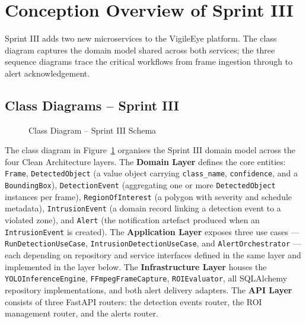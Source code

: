 \section{Conception Overview of Sprint III}
\label{sec:s3_conception}

\hspace{0.8cm}Sprint III adds two new microservices to the VigileEye platform. The class diagram captures the domain model shared across both services; the three sequence diagrams trace the critical workflows from frame ingestion through to alert acknowledgement.

\subsection{Class Diagrams -- Sprint III}
\label{subsec:s3_class}

\begin{figure}[H]
\centering
{}
\caption{Class Diagram -- Sprint III Schema}
\label{fig:sprint3_class}
\end{figure}

\hspace{0.8cm}The class diagram in Figure~\ref{fig:sprint3_class} organises the Sprint III domain model across the four Clean Architecture layers. The \textbf{Domain Layer} defines the core entities: \texttt{Frame}, \texttt{DetectedObject} (a value object carrying \texttt{class\_name}, \texttt{confidence}, and a \texttt{BoundingBox}), \texttt{DetectionEvent} (aggregating one or more \texttt{DetectedObject} instances per frame), \texttt{RegionOfInterest} (a polygon with severity and schedule metadata), \texttt{IntrusionEvent} (a domain record linking a detection event to a violated zone), and \texttt{Alert} (the notification artefact produced when an \texttt{IntrusionEvent} is created). The \textbf{Application Layer} exposes three use cases — \texttt{RunDetectionUseCase}, \texttt{IntrusionDetectionUseCase}, and \texttt{AlertOrchestrator} — each depending on repository and service interfaces defined in the same layer and implemented in the layer below. The \textbf{Infrastructure Layer} houses the \texttt{YOLOInferenceEngine}, \texttt{FFmpegFrameCapture}, \texttt{ROIEvaluator}, all SQLAlchemy repository implementations, and both alert delivery adapters. The \textbf{API Layer} consists of three FastAPI routers: the detection events router, the ROI management router, and the alerts router.

